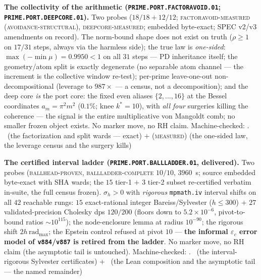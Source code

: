 \par\smallskip\noindent\textbf{The collectivity of the
arithmetic (\texttt{PRIME.PORT.\allowbreak FACTORAVOID.01};
\texttt{PRIME.PORT.\allowbreak DEEPCORE.01}).}
Two probes ($18/18 + 12/12$; \textsc{factoravoid-measured
(avoidance-structural)}, \textsc{deepcore-measured}; embedded
byte-exact; SPEC v2/v3 amendments on record).  The norm-bound
shape does not exist on truth ($\rho \ge 1$ on $17/31$ steps,
always via the harmless side); the true law is
\emph{one-sided}: $\max(-\min\mu) = 0.9950 < 1$ on all $31$
steps --- PD inheritance itself; the geometry/atom split is
exactly degenerate (no separable atom channel --- the
increment is the collective window re-test); per-prime
leave-one-out non-decompositional (leverage to $987\times$ ---
a census, not a decomposition); and the deep core \emph{is}
the port core: the fixed even aliases $\{2, \dots, 16\}$ at
the Bessel coordinates $a_m = \pi^2 m^2$ ($0.1\%$; knee $k^{*}
= 10$), with \emph{all four} surgeries killing the coherence
--- the signal is the entire multiplicative von Mangoldt comb;
no smaller frozen object exists.  No marker move, no RH claim.
Machine-checked: .
\mE\ (the factorization and split wards --- exact) $+$
(\textsc{measured}) (the one-sided law, the leverage census
and the surgery kills)
\par\smallskip


\par\smallskip\noindent\textbf{The certified interval ladder
(\texttt{PRIME.PORT.\allowbreak BALLLADDER.01}, delivered).}
Two probes (\textsc{ballhead-proven},
\textsc{ballladder-complete} $10/10$, $3960$~s; source embedded
byte-exact with SHA wards; the $15$ tier-1 $+$ $3$ tier-2
subset re-certified verbatim in-suite, the full census frozen).
$\sigma_h > 0$ with \emph{rigorous} \texttt{mpmath.iv} interval
shifts on all $42$ reachable rungs: $15$ exact-rational integer
Bareiss/Sylvester ($h \le 300$) $+$ $27$ validated-precision
Cholesky dps $120/200$ (floors down to $5.2\times10^{-6}$,
pivot-to-bound ratios ${\sim}10^{115}$); the node-enclosure
lemma at radius $10^{-90}$; the rigorous shift
$2h\,\mathrm{rad}_{\max}$; the Epstein control refused at pivot
$10$ --- \textbf{the informal $\varepsilon_c$ error model of
\texttt{v884}/\texttt{v887} is retired from the ladder}.  No
marker move, no RH claim (the asymptotic tail is untouched).
Machine-checked: .
\mE\ (the interval-rigorous Sylvester certificates) $+$ \mO\
(the Lean composition and the asymptotic tail --- the named
remainder)
\par\smallskip


